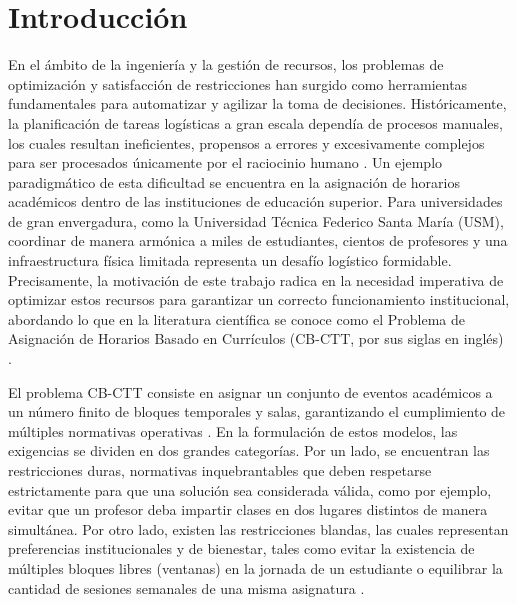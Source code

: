 \documentclass[letter, 10pt]{article}
\begin{document}
\section{Introducción}

En el ámbito de la ingeniería y la gestión de recursos, los problemas de optimización y satisfacción de restricciones han surgido como herramientas fundamentales para automatizar y agilizar la toma de decisiones. Históricamente, la planificación de tareas logísticas a gran escala dependía de procesos manuales, los cuales resultan ineficientes, propensos a errores y excesivamente complejos para ser procesados únicamente por el raciocinio humano \cite{schaerf1999}. Un ejemplo paradigmático de esta dificultad se encuentra en la asignación de horarios académicos dentro de las instituciones de educación superior. Para universidades de gran envergadura, como la Universidad Técnica Federico Santa María (USM), coordinar de manera armónica a miles de estudiantes, cientos de profesores y una infraestructura física limitada representa un desafío logístico formidable. Precisamente, la motivación de este trabajo radica en la necesidad imperativa de optimizar estos recursos para garantizar un correcto funcionamiento institucional, abordando lo que en la literatura científica se conoce como el Problema de Asignación de Horarios Basado en Currículos (CB-CTT, por sus siglas en inglés) \cite{digaspero2007}.

El problema CB-CTT consiste en asignar un conjunto de eventos académicos a un número finito de bloques temporales y salas, garantizando el cumplimiento de múltiples normativas operativas \cite{decesco2008}. En la formulación de estos modelos, las exigencias se dividen en dos grandes categorías. Por un lado, se encuentran las restricciones duras, normativas inquebrantables que deben respetarse estrictamente para que una solución sea considerada válida, como por ejemplo, evitar que un profesor deba impartir clases en dos lugares distintos de manera simultánea. Por otro lado, existen las restricciones blandas, las cuales representan preferencias institucionales y de bienestar, tales como evitar la existencia de múltiples bloques libres (ventanas) en la jornada de un estudiante o equilibrar la cantidad de sesiones semanales de una misma asignatura \cite{digaspero2007}.
\end{document}
